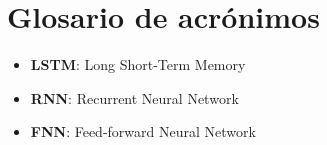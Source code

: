 \chapter*{Glosario de acrónimos}

\begin{itemize}
\item{\textbf{LSTM}:  Long Short-Term Memory}
\item{\textbf{RNN}:  Recurrent Neural Network}
\item{\textbf{FNN}: Feed-forward Neural Network}

\end{itemize}

\newpage \thispagestyle{empty} %

